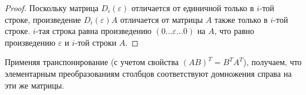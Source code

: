 \begin{enumerate}
    \begin{proof}
        Поскольку матрица $D_i(\varepsilon)$ отличается от единичной только в $i$-той строке, произведение $D_i(\varepsilon)A$ отличается от матрицы $A$ также только в $i$-той строке.
        $i$-тая строка равна произведению $(0 \dots \varepsilon \dots 0)$ на $A$, что равно произведению $\varepsilon$ и $i$-той строки $A$.    
    \end{proof}
\end{enumerate}

\begin{notice}
    Применяя транспонирование (с учетом свойства $(AB)^T = B^TA^T$), получаем, что элементарным преобразованиям столбцов 
    соответствуют домножения справа на эти же матрицы.
\end{notice}